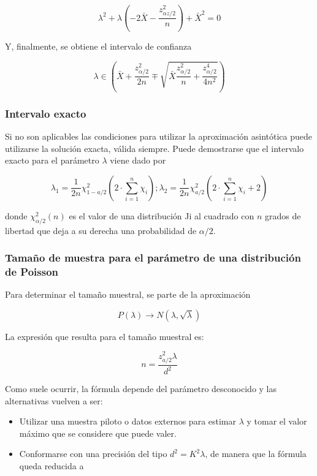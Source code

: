 \documentclass[
]{article}
\providecommand{\tightlist}{%
  \setlength{\itemsep}{0pt}\setlength{\parskip}{0pt}}
\begin{document}
\[
\lambda^{2}+\lambda\left(-2 \bar{X}-\frac{z_{\alpha z / 2}^{2}}{n}\right)+\bar{X}^{2}=0
\]

Y, finalmente, se obtiene el intervalo de confianza

\[
\lambda \in\left(\bar{X}+\frac{z_{\alpha / 2}^{2}}{2 n} \mp \sqrt{\bar{X} \frac{z_{\alpha / 2}^{2}}{n}+\frac{z_{\alpha / 2}^{4}}{4 n^{2}}}\right)
\]

\subsubsection{Intervalo exacto}\label{intervalo-exacto-1}

Si no son aplicables las condiciones para utilizar la aproximación asintótica puede utilizarse la solución exacta, válida siempre. Puede demostrarse que el intervalo exacto para el parámetro \(\lambda\) viene dado por

\[
\lambda_{1}=\frac{1}{2 n} \chi_{1-a / 2}^{2}\left(2 \cdot \sum_{i=1}^{n} \chi_{i}\right) ; \lambda_{2}=\frac{1}{2 n} \chi_{a / 2}^{2}\left(2 \cdot \sum_{i=1}^{n} \chi_{i}+2\right)
\]

donde \(\chi_{\alpha / 2}^{2}(n)\) es el valor de una distribución Ji al cuadrado con \(n\) grados de libertad que deja a su derecha una probabilidad de \(\alpha / 2\).

\subsubsection{Tamaño de muestra para el parámetro de una distribución de Poisson}\label{tamauxf1o-de-muestra-para-el-paruxe1metro-de-una-distribuciuxf3n-de-poisson}

Para determinar el tamaño muestral, se parte de la aproximación

\[
P(\lambda) \rightarrow N(\lambda, \sqrt{\lambda})
\]

La expresión que resulta para el tamaño muestral es:

\[
n=\frac{z_{a / 2}^{2} \lambda}{d^{2}}
\]

Como suele ocurrir, la fórmula depende del parámetro desconocido y las alternativas vuelven a ser:

\begin{itemize}
\tightlist
\item
  Utilizar una muestra piloto o datos externos para estimar \(\lambda\) y tomar el valor máximo que se considere que puede valer.
\item
  Conformarse con una precisión del tipo \(d^{2}=K^{2} \lambda\), de manera que la fórmula queda reducida a
\end{itemize}
\end{document}
